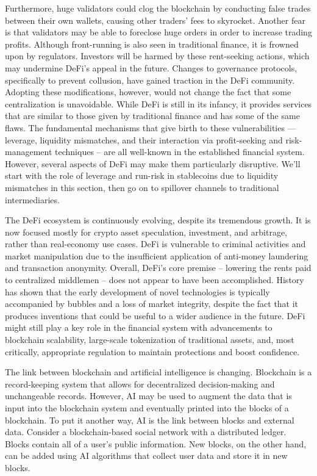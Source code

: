 \documentclass[10pt,twocolumn]{article}
\begin{document}
\begin{Ethics}
Furthermore, huge validators could clog the blockchain by conducting false trades between their own wallets, causing other traders' fees to skyrocket. Another fear is that validators may be able to foreclose huge orders in order to increase trading profits. Although front-running is also seen in traditional finance, it is frowned upon by regulators. Investors will be harmed by these rent-seeking actions, which may undermine DeFi's appeal in the future. Changes to governance protocols, specifically to prevent collusion, have gained traction in the DeFi community. Adopting these modifications, however, would not change the fact that some centralization is unavoidable.
While DeFi is still in its infancy, it provides services that are similar to those given by traditional finance and has some of the same flaws. The fundamental mechanisms that give birth to these vulnerabilities — leverage, liquidity mismatches, and their interaction via profit-seeking and risk-management techniques – are all well-known in the established financial system. However, several aspects of DeFi may make them particularly disruptive. We'll start with the role of leverage and run-risk in stablecoins due to liquidity mismatches in this section, then go on to spillover channels to traditional intermediaries.

The DeFi ecosystem is continuously evolving, despite its tremendous growth. It is now focused mostly for crypto asset speculation, investment, and arbitrage, rather than real-economy use cases. DeFi is vulnerable to criminal activities and market manipulation due to the insufficient application of anti-money laundering and transaction anonymity. Overall, DeFi's core premise – lowering the rents paid to centralized middlemen – does not appear to have been accomplished.
History has shown that the early development of novel technologies is typically accompanied by bubbles and a loss of market integrity, despite the fact that it produces inventions that could be useful to a wider audience in the future. DeFi might still play a key role in the financial system with advancements to blockchain scalability, large-scale tokenization of traditional assets, and, most critically, appropriate regulation to maintain protections and boost confidence.

The link between blockchain and artificial intelligence is changing. Blockchain is a record-keeping system that allows for decentralized decision-making and unchangeable records. However, AI may be used to augment the data that is input into the blockchain system and eventually printed into the blocks of a blockchain. To put it another way, AI is the link between blocks and external data. Consider a blockchain-based social network with a distributed ledger. Blocks contain all of a user's public information. New blocks, on the other hand, can be added using AI algorithms that collect user data and store it in new blocks.


\end{Ethics}
\end{document}
